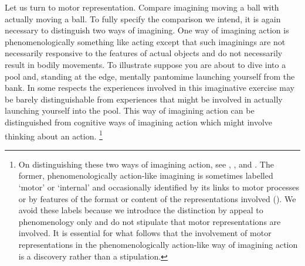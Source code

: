 \documentclass[12pt,\papersize]{extarticle}
\begin{document}
Let us turn to motor representation. Compare imagining moving a ball with actually moving a ball.  To fully specify the comparison we intend, it is again necessary to distinguish two ways of imagining. One way of imagining action is phenomenologically something like acting except that such imaginings are not necessarily responsive to the features of actual objects and do not necessarily result in bodily movements. To illustrate suppose you are about to dive into a pool and, standing at the edge, mentally pantomime launching yourself from the bank. In some respects the experiences involved in this imaginative exercise may be barely distinguishable from experiences that might be involved in actually launching yourself into the pool. This way of imagining action can be distinguished from cognitive ways of imagining action which might involve thinking about an action.%
\footnote{
On distinguishing these two ways of imagining action, see \citet[p.\ 161]{currie:1997_mental}, \citet[p.\ 727]{jeannerod:1995_mental}, and \citet[p.\ 638-9]{kosslyn:2001_neural}. The former, phenomenologically action-like imagining is sometimes labelled `motor' or `internal' and occasionally identified by its links to motor processes or by features of the format or content of the representations involved (\citealp[p.\ 1400]{annett:1995_motor}). We avoid these labels because we introduce the distinction by appeal to phenomenology only and do not stipulate that motor representations are involved. It is essential for what follows that the involvement of motor representations in the phenomenologically action-like way of imagining action is a discovery rather than a stipulation.
}
\end{document}
